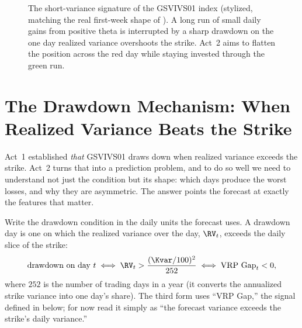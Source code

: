 \begin{figure}[ht]
\centering
{}
\caption{The short-variance signature of the GSVIVS01 index (stylized, matching the real first-week shape of ). A long run of small daily gains from positive theta is interrupted by a sharp drawdown on the one day realized variance overshoots the strike. Act~2 aims to flatten the position across the red day while staying invested through the green run.}
\label{fig:gsvivs:indexpath}
\end{figure}

\section{The Drawdown Mechanism: When Realized Variance Beats the Strike}
\label{sec:gsvivs:drawdown-mechanism}

Act~1 established \emph{that} GSVIVS01 draws down when realized variance exceeds the strike. Act~2 turns that into a prediction problem, and to do so well we need to understand not just the condition but its shape: which days produce the worst losses, and why they are asymmetric. The answer points the forecast at exactly the features that matter.

Write the drawdown condition in the daily units the forecast uses. A drawdown day is one on which the realized variance over the day, $\RV_t$, exceeds the daily slice of the strike:
\begin{equation}
\label{eq:gsvivs:drawdown}
\text{drawdown on day } t \iff \RV_t > \frac{(\Kvar/100)^2}{252} \iff \text{VRP Gap}_t < 0,
\end{equation}
where $252$ is the number of trading days in a year (it converts the annualized strike variance into one day's share). The third form uses ``VRP Gap,'' the signal defined in  below; for now read it simply as ``the forecast variance exceeds the strike's daily variance.''

